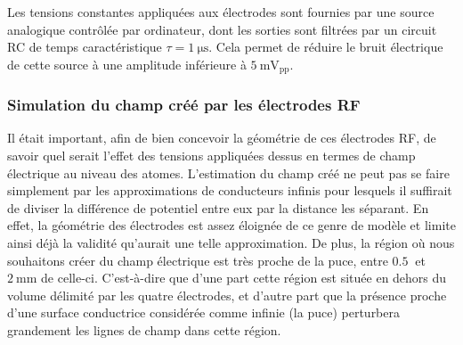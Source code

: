 Les tensions constantes appliquées aux électrodes sont fournies par une source analogique contrôlée par ordinateur, dont les sorties sont filtrées par un circuit RC de temps caractéristique $\tau=\SI{1}{\us}$.
Cela permet de réduire le bruit électrique de cette source à une amplitude inférieure à $\SI{5}{\milli\V}_{\mathrm{pp}}$.

\subsubsection*{Simulation du champ créé par les électrodes RF}
\noindent Il était important, afin de bien concevoir la géométrie de ces électrodes RF, de savoir quel serait l'effet des tensions appliquées dessus en termes de champ électrique au niveau des atomes.
L'estimation du champ créé ne peut pas se faire simplement par les approximations de conducteurs infinis pour lesquels il suffirait de diviser la différence de potentiel entre eux par la distance les séparant.
En effet, la géométrie des électrodes est assez éloignée de ce genre de modèle et limite ainsi déjà la validité qu'aurait une telle approximation.
De plus, la région où nous souhaitons créer du champ électrique est très proche de la puce, entre $\SI{0.5}{}$ et $\SI{2}{\mm}$ de celle-ci.
C'est-à-dire que d'une part cette région est située en dehors du volume délimité par les quatre électrodes, et d'autre part que la présence proche d'une surface conductrice considérée comme infinie (la puce) perturbera grandement les lignes de champ dans cette région.

